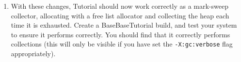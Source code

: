 \documentclass{article}
\newcommand{\code}[1]{\texttt{#1}}
\begin{document}
\begin{itemize}
\begin{enumerate}
\begin{enumerate}
    \end{enumerate}

    \item With these changes, Tutorial should now work correctly as a
    mark-sweep collector, allocating with a free list allocator and
    collecting the heap each time it is exhausted. Create a
    BaseBaseTutorial build, and test your system to ensure it performs
    correctly.  You should find that it correctly performs
    collections (this will only be visible if you have set the
    \code{-X:gc:verbose} flag appropriately).

    \end{enumerate}
\end{itemize}


%
%
%
\end{document}
